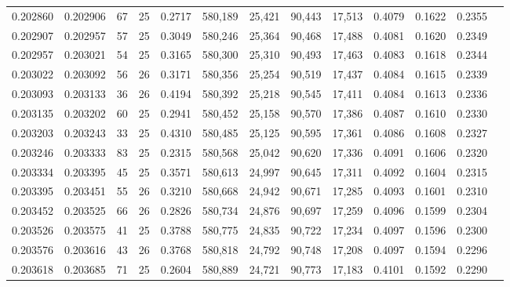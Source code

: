 \begin{tabular}{rrrrrrrrrrrrr}
0.202860 & 0.202906 &  67 &  25 &                                     0.2717 & 580,189 &  25,421 &  90,443 &  17,513 & 0.4079 & 0.1622 & 0.2355 \\
0.202907 & 0.202957 &  57 &  25 &                                     0.3049 & 580,246 &  25,364 &  90,468 &  17,488 & 0.4081 & 0.1620 & 0.2349 \\
0.202957 & 0.203021 &  54 &  25 &                                     0.3165 & 580,300 &  25,310 &  90,493 &  17,463 & 0.4083 & 0.1618 & 0.2344 \\
0.203022 & 0.203092 &  56 &  26 &                                     0.3171 & 580,356 &  25,254 &  90,519 &  17,437 & 0.4084 & 0.1615 & 0.2339 \\
0.203093 & 0.203133 &  36 &  26 &                                     0.4194 & 580,392 &  25,218 &  90,545 &  17,411 & 0.4084 & 0.1613 & 0.2336 \\
0.203135 & 0.203202 &  60 &  25 &                                     0.2941 & 580,452 &  25,158 &  90,570 &  17,386 & 0.4087 & 0.1610 & 0.2330 \\
0.203203 & 0.203243 &  33 &  25 &                                     0.4310 & 580,485 &  25,125 &  90,595 &  17,361 & 0.4086 & 0.1608 & 0.2327 \\
0.203246 & 0.203333 &  83 &  25 &                                     0.2315 & 580,568 &  25,042 &  90,620 &  17,336 & 0.4091 & 0.1606 & 0.2320 \\
0.203334 & 0.203395 &  45 &  25 &                                     0.3571 & 580,613 &  24,997 &  90,645 &  17,311 & 0.4092 & 0.1604 & 0.2315 \\
0.203395 & 0.203451 &  55 &  26 &                                     0.3210 & 580,668 &  24,942 &  90,671 &  17,285 & 0.4093 & 0.1601 & 0.2310 \\
0.203452 & 0.203525 &  66 &  26 &                                     0.2826 & 580,734 &  24,876 &  90,697 &  17,259 & 0.4096 & 0.1599 & 0.2304 \\
0.203526 & 0.203575 &  41 &  25 &                                     0.3788 & 580,775 &  24,835 &  90,722 &  17,234 & 0.4097 & 0.1596 & 0.2300 \\
0.203576 & 0.203616 &  43 &  26 &                                     0.3768 & 580,818 &  24,792 &  90,748 &  17,208 & 0.4097 & 0.1594 & 0.2296 \\
0.203618 & 0.203685 &  71 &  25 &                                     0.2604 & 580,889 &  24,721 &  90,773 &  17,183 & 0.4101 & 0.1592 & 0.2290 \\

\end{tabular}
